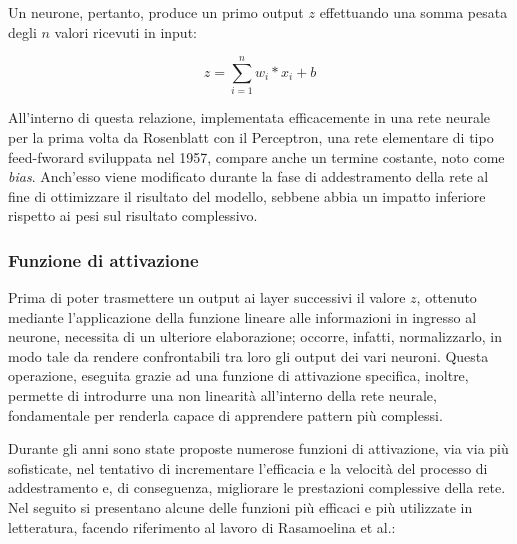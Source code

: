 Un neurone, pertanto, produce un primo output $z$ effettuando una somma pesata degli $n$ valori ricevuti in input:

    \begin{equation}
        z = \sum_{i=1}^{n} w_{i}*x_{i} + b
        \label{eq:linear_function}
    \end{equation}

All'interno di questa relazione, implementata efficacemente in una rete neurale per la prima volta da Rosenblatt con il Perceptron, una rete elementare di tipo feed-fworard sviluppata nel 1957, compare anche un termine costante, noto come \textit{bias}. Anch'esso viene modificato durante la fase di addestramento della rete al fine di ottimizzare il risultato del modello, sebbene abbia un impatto inferiore rispetto ai pesi sul risultato complessivo. 


\subsubsection{Funzione di attivazione}

Prima di poter trasmettere un output ai layer successivi il valore $z$, ottenuto mediante l'applicazione della funzione lineare alle informazioni in ingresso al neurone, necessita di un ulteriore elaborazione; occorre, infatti, normalizzarlo, in modo tale da rendere confrontabili tra loro gli output dei vari neuroni. Questa operazione, eseguita grazie ad una funzione di attivazione specifica, inoltre, permette di introdurre una non linearità all'interno della rete neurale, fondamentale per renderla capace di apprendere pattern più complessi.

Durante gli anni sono state proposte numerose funzioni di attivazione, via via più sofisticate, nel tentativo di incrementare l'efficacia e la velocità del processo di addestramento e, di conseguenza, migliorare le prestazioni complessive della rete. Nel seguito si presentano alcune delle funzioni più efficaci e più utilizzate in letteratura, facendo riferimento al lavoro di Rasamoelina et al.\cite{Activation_function}:

